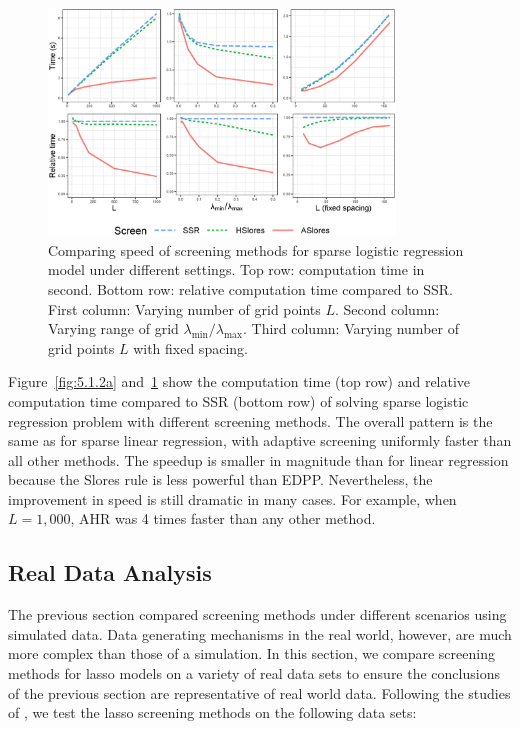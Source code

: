 \documentclass[]{interact}
\theoremstyle{plain}%
\theoremstyle{definition}
\theoremstyle{remark}
\begin{document}
\begin{figure}[h]
    \centering
    \includegraphics[width=0.82\textwidth]{512b.eps}    \caption{Comparing speed of screening methods for sparse logistic regression model under different settings. Top row: computation time in second. Bottom row: relative computation time compared to SSR. First column: Varying number of grid points $L$. Second column: Varying range of grid $\lambda_{\min}/\lambda_{\max}$. Third column: Varying number of grid points $L$ with fixed spacing.}
    \label{fig:5.1.2b}
\end{figure}

Figure~\ref{fig:5.1.2a} and~\ref{fig:5.1.2b} show the computation time (top row) and relative computation time compared to SSR (bottom row) of solving sparse logistic regression problem with different screening methods. The overall pattern is the same as for sparse linear regression, with adaptive screening uniformly faster than all other methods. The speedup is smaller in magnitude than for linear regression because the Slores rule is less powerful than EDPP. Nevertheless, the improvement in speed is still dramatic in many cases. For example, when $L=1,000$, AHR was 4 times faster than any other method.

\subsection{Real Data Analysis}
\label{sec:real-data}

The previous section compared screening methods under different scenarios using simulated data. Data generating mechanisms in the real world, however, are much more complex than those of a simulation. In this section, we compare screening methods for lasso models on a variety of real data sets to ensure the conclusions of the previous section are representative of real world data. Following the studies of \citep{wang2013lasso, xiang2016screening, Zeng2021}, we test the lasso screening methods on the following data sets:
\end{document}
